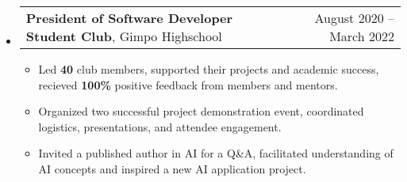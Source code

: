 \documentclass[letterpaper,11pt]{article}
\makeatletter
\newcommand{\resumeItem}[1]{
  \item\small{
    {#1 \vspace{-3pt}}
  }
}
\newcommand{\resumeProjectHeading}[2]{
    \item
    \begin{tabular*}{0.97\textwidth}{l@{\extracolsep{\fill}}r@{\hspace{-0.2in}}}
        \small#1 & \small#2 \\
    \end{tabular*}\vspace{-7pt}
}
\newcommand{\resumeSubHeadingListStart}{\begin{itemize}[leftmargin=0.00in, rightmargin=-0.2in, label={}]}
\newcommand{\resumeSubHeadingListEnd}{\end{itemize}\vspace{-7pt}}
\newcommand{\resumeItemListStart}{\begin{itemize}[leftmargin=0.15in, rightmargin=0.15in]}
\newcommand{\resumeItemListEnd}{\end{itemize}\vspace{-7pt}}
\makeatother
\begin{document}
\resumeSubHeadingListStart
\resumeProjectHeading
{\textbf{President of Software Developer Student Club}, Gimpo Highschool}{August 2020 -- March 2022}
\resumeItemListStart
\resumeItem{Led \textbf{40} club members, supported their projects and academic success, recieved \textbf{100\%} positive feedback from members and mentors.}
\resumeItem{Organized two successful project demonstration event, coordinated logistics, presentations, and attendee engagement.}
\resumeItem{Invited a published author in AI for a Q\&A, facilitated understanding of AI concepts and inspired a new AI application project.}
\resumeItemListEnd
\resumeSubHeadingListEnd
\end{document}
